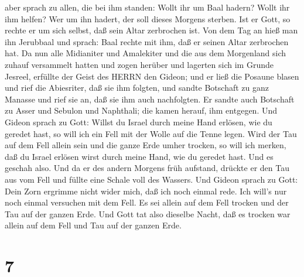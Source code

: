 aber sprach zu allen, die bei ihm standen: Wollt ihr um Baal hadern?
Wollt ihr ihm helfen? Wer um ihn hadert, der soll dieses Morgens
sterben. Ist er Gott, so rechte er um sich selbst, daß sein Altar
zerbrochen ist.  Von dem Tag an hieß man ihn Jerubbaal und
sprach: Baal rechte mit ihm, daß er seinen Altar zerbrochen hat.
 Da nun alle Midianiter und Amalekiter und die aus dem
Morgenland sich zuhauf versammelt hatten und zogen herüber und lagerten
sich im Grunde Jesreel,  erfüllte der Geist des HERRN den
Gideon; und er ließ die Posaune blasen und rief die Abiesriter, daß sie
ihm folgten,  und sandte Botschaft zu ganz Manasse und rief
sie an, daß sie ihm auch nachfolgten. Er sandte auch Botschaft zu Asser
und Sebulon und Naphthali; die kamen herauf, ihm entgegen. 
Und Gideon sprach zu Gott: Willst du Israel durch meine Hand erlösen,
wie du geredet hast,  so will ich ein Fell mit der Wolle
auf die Tenne legen. Wird der Tau auf dem Fell allein sein und die ganze
Erde umher trocken, so will ich merken, daß du Israel erlösen wirst
durch meine Hand, wie du geredet hast.  Und es geschah
also. Und da er des andern Morgens früh aufstand, drückte er den Tau aus
vom Fell und füllte eine Schale voll des Wassers.  Und
Gideon sprach zu Gott: Dein Zorn ergrimme nicht wider mich, daß ich noch
einmal rede. Ich will's nur noch einmal versuchen mit dem Fell. Es sei
allein auf dem Fell trocken und der Tau auf der ganzen Erde.
 Und Gott tat also dieselbe Nacht, daß es trocken war
allein auf dem Fell und Tau auf der ganzen Erde.

\hypertarget{section-6}{%
\section{7}\label{section-6}}

